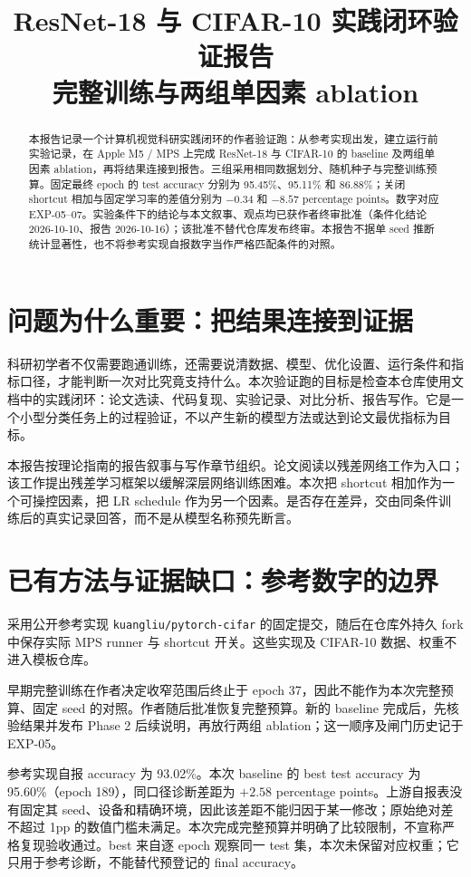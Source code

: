 \documentclass[conference]{IEEEtran}
\title{ResNet-18 与 CIFAR-10 实践闭环验证报告\\
\large 完整训练与两组单因素 ablation}
\author{\IEEEauthorblockN{Habit130}
\IEEEauthorblockA{cv-research-practice 作者验证跑\\报告形成 2026-10-10 · 作者终审批准 2026-10-16}}
\begin{document}
\maketitle
\begin{abstract}
本报告记录一个计算机视觉科研实践闭环的作者验证跑：从参考实现出发，建立运行前实验记录，在 Apple M5 / MPS 上完成 ResNet-18 与 CIFAR-10 的 baseline 及两组单因素 ablation，再将结果连接到报告。三组采用相同数据划分、随机种子与完整训练预算。固定最终 epoch 的 test accuracy 分别为 95.45\%、95.11\% 和 86.88\%；关闭 shortcut 相加与固定学习率的差值分别为 $-0.34$ 和 $-8.57$ percentage points。数字对应 EXP-05--07。实验条件下的结论与本文叙事、观点均已获作者终审批准（条件化结论 2026-10-10、报告 2026-10-16）；该批准不替代仓库发布终审。本报告不据单 seed 推断统计显著性，也不将参考实现自报数字当作严格匹配条件的对照。
\end{abstract}

\section{问题为什么重要：把结果连接到证据}
科研初学者不仅需要跑通训练，还需要说清数据、模型、优化设置、运行条件和指标口径，才能判断一次对比究竟支持什么。本次验证跑的目标是检查本仓库使用文档中的实践闭环：论文选读、代码复现、实验记录、对比分析、报告写作。它是一个小型分类任务上的过程验证，不以产生新的模型方法或达到论文最优指标为目标。

本报告按理论指南的报告叙事与写作章节组织\cite{guide}。论文阅读以残差网络工作为入口\cite{resnet}；该工作提出残差学习框架以缓解深层网络训练困难。本次把 shortcut 相加作为一个可操控因素，把 LR schedule 作为另一个因素。是否存在差异，交由同条件训练后的真实记录回答，而不是从模型名称预先断言。

\section{已有方法与证据缺口：参考数字的边界}
采用公开参考实现 \texttt{kuangliu/pytorch-cifar} 的固定提交，随后在仓库外持久 fork 中保存实际 MPS runner 与 shortcut 开关\cite{exp05}。这些实现及 CIFAR-10 数据、权重不进入模板仓库。

早期完整训练在作者决定收窄范围后终止于 epoch 37，因此不能作为本次完整预算、固定 seed 的对照\cite{exp04}。作者随后批准恢复完整预算。新的 baseline 完成后，先核验结果并发布 Phase 2 后续说明，再放行两组 ablation；这一顺序及闸门历史记于 EXP-05。

参考实现自报 accuracy 为 93.02\%。本次 baseline 的 best test accuracy 为 95.60\%（epoch 189），同口径诊断差距为 $+2.58$ percentage points\cite{exp05}。上游自报表没有固定其 seed、设备和精确环境，因此该差距不能归因于某一修改；原始绝对差不超过 1pp 的数值门槛未满足。本次完成完整预算并明确了比较限制，不宣称严格复现验收通过。best 来自逐 epoch 观察同一 test 集，本次未保留对应权重；它只用于参考诊断，不能替代预登记的 final accuracy。
\end{document}
